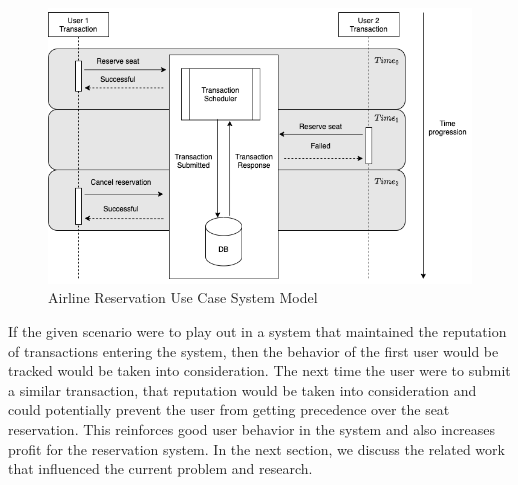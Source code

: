 \begin{figure}
\centering
\includegraphics[scale=0.50]{images/AirlineReservation_Overview.png}
\caption{Airline Reservation Use Case System Model}
\label{image:airline_reservation_system_model}
\end{figure}

If the given scenario were to play out in a system that maintained the reputation of transactions entering the system, then the behavior of the first user would be tracked would be taken into consideration. The next time the user were to submit a similar transaction, that reputation would be taken into consideration and could potentially prevent the user from getting precedence over the seat reservation. This reinforces good user behavior in the system and also increases profit for the reservation system. In the next section, we discuss the related work that influenced the current problem and research.